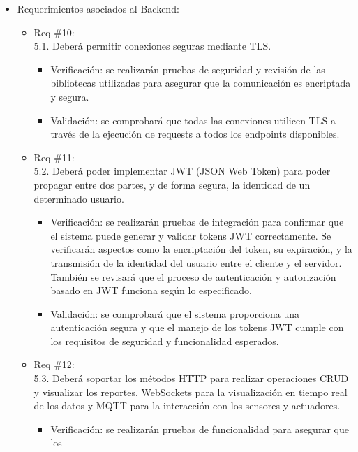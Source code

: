 \begin{itemize}
	\item Requerimientos asociados al Backend:
	      \begin{itemize}
		      \item Req \#10:\\ 5.1. Deberá permitir conexiones seguras mediante TLS.
		            \begin{itemize}
			            \item Verificación: se realizarán pruebas de seguridad y revisión de las bibliotecas
			                  utilizadas para asegurar que la comunicación es encriptada y segura.
			            \item Validación: se comprobará que todas las conexiones utilicen TLS a través de la
			                  ejecución de requests a todos los endpoints disponibles.
		            \end{itemize}
		      \item Req \#11: \\ 5.2. Deberá poder implementar JWT (JSON Web Token) para poder
		            propagar entre dos partes, y de forma segura, la identidad de un determinado
		            usuario.
		            \begin{itemize}
			            \item Verificación: se realizarán pruebas de integración para confirmar que el
			                  sistema puede generar y validar tokens JWT correctamente. Se verificarán
			                  aspectos como la encriptación del token, su expiración, y la transmisión de la
			                  identidad del usuario entre el cliente y el servidor. También se revisará que
			                  el proceso de autenticación y autorización basado en JWT funciona según lo
			                  especificado.
			            \item Validación: se comprobará que el sistema proporciona una autenticación segura y
			                  que el manejo de los tokens JWT cumple con los requisitos de seguridad y
			                  funcionalidad esperados.
		            \end{itemize}
		      \item Req \#12: \\ 5.3. Deberá soportar los métodos HTTP para realizar operaciones
		            CRUD y visualizar los reportes, WebSockets para la visualización en tiempo real
		            de los datos y MQTT para la interacción con los sensores y actuadores.
		            \begin{itemize}
			            \item Verificación: se realizarán pruebas de funcionalidad para asegurar que los

\end{itemize}
\end{itemize}
\end{itemize}
